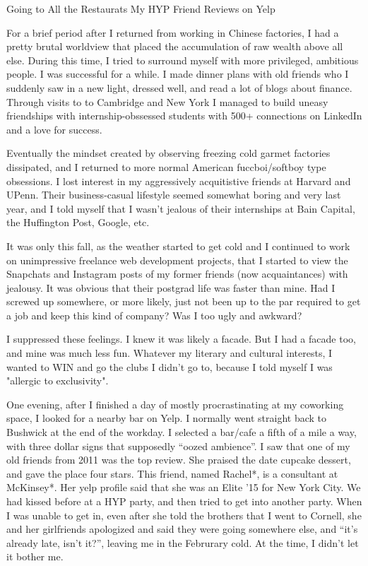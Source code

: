 Going to All the Restaurats My HYP Friend Reviews on Yelp

For a brief period after I returned from working in Chinese factories, I had a
pretty brutal worldview that placed the accumulation of raw wealth above all
else.  During this time, I tried to surround myself with more privileged,
ambitious people.  I was successful for a while.  I made dinner plans with old
friends who I suddenly saw in a new light, dressed well, and read a lot of blogs
about finance.  Through visits to to Cambridge and New York I managed to build
uneasy friendships with internship-obssessed students with 500+ connections on
LinkedIn and a love for success.

Eventually the mindset created by observing freezing cold garmet factories
dissipated, and I returned to more normal American fuccboi/softboy type
obsessions.  I lost interest in my aggressively acquitistive friends at Harvard
and UPenn.  Their business-casual lifestyle seemed somewhat boring and very last
year, and I told myself that I wasn't jealous of their internships at Bain
Capital, the Huffington Post, Google, etc.

It was only this fall, as the weather started to get cold and I continued to
work on unimpressive freelance web development projects, that I started to view
the Snapchats and Instagram posts of my former friends (now acquaintances) with
jealousy.  It was obvious that their postgrad life was faster than mine.  Had I
screwed up somewhere, or more likely, just not been up to the par required to
get a job and keep this kind of company?  Was I too ugly and awkward?

I suppressed these feelings.  I knew it was likely a facade.  But I had a facade
too, and mine was much less fun.  Whatever my literary and cultural interests, I
wanted to WIN and go the clubs I didn't go to, because I told myself I was
"allergic to exclusivity".

One evening, after I finished a day of mostly procrastinating at my coworking
space, I looked for a nearby bar on Yelp.  I normally went straight back to
Bushwick at the end of the workday.  I selected a bar/cafe a fifth of a mile a
way, with three dollar signs that supposedly ``oozed ambience''.  I saw that one
of my old friends from 2011 was the top review.  She praised the date cupcake
dessert, and gave the place four stars.  This friend, named Rachel*, is a
consultant at McKinsey*.  Her yelp profile said that she was an Elite '15 for
New York City.  We had kissed before at a HYP party, and then tried to get into
another party.  When I was unable to get in, even after she told the brothers
that I went to Cornell,  she and her girlfriends apologized and said they were
going somewhere else, and ``it's already late, isn't it?'', leaving me in the
Februrary cold.  At the time, I didn't let it bother me.


